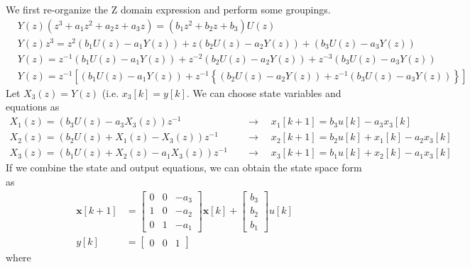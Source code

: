 \documentclass[twoside]{article}
\begin{document}
We first re-organize the Z domain expression and perform some
groupings. 
%
\begin{align*}
&Y(z) \left( z^3+ a_1 z^2 + a_2 z + a_3 z \right) = \left( b_1 z^2 + b_2 z + b_3 \right) U(z)
\\
&Y(z) z^3 = z^2 \left( b_1 U(z) - a_1 Y(z) \right) 
+  z \left( b_2 U(z) - a_2 Y(z) \right) +  \left( b_3 U(z) - a_3 Y(z)
  \right) 
\\
&Y(z) = z^{-1} \left( b_1 U(z) - a_1 Y(z) \right) 
+  z^{-2} \left( b_2 U(z) - a_2 Y(z) \right) + z^{-3} \left( b_3 U(z)
  - a_3 Y(z) \right) 
\\
&Y(z) = z^{-1} \left[ \left( b_1 U(z) - a_1 Y(z) \right) 
+  z^{-1} \left\lbrace \left( b_2 U(z) - a_2 Y(z) \right) + z^{-1} \left( b_3 U(z)
  - a_3 Y(z) \right) \right\rbrace \right]
\end{align*}
%
Let $X_3(z) = Y(z)$ (i.e. $x_3[k] = y[k]$. We can choose state
variables and equations as
%
\begin{align*}
X_1(z) = \left( b_3 U(z) - a_3 X_3(z) \right) z^{-1}
\quad &\rightarrow \quad x_1[k+1] = b_3 u[k] - a_3  x_3[k] 
\\
X_2(z) = \left( b_2 U(z) + X_1(z) - X_3(z) \right) z^{-1}
\quad &\rightarrow \quad x_2[k+1] = b_2 u[k] + x_1[k] - a_2 
        x_3[k] 
\\
X_3(z) = \left( b_1 U(z) + X_2(z) - a_1 X_3(z) \right) z^{-1}
\quad &\rightarrow \quad x_3[k+1] = b_1 u[k] + x_2[k] - a_1 
        x_3[k] 
\end{align*}
%
If we combine the state and output equations, we
can obtain the state space form as
%
%
\begin{align*}
  \mathbf{x}[k+1] &= \left[ \begin{array}{ccc} 0 & 0 & -a_3 \\ 1 & 0 & -a_2
    \\ 0 & 1 & -a_1 \end{array} \right] \mathbf{x}[k]
   + 
  \left[ \begin{array}{c} b_3 \\ b_2 
    \\ b_1 \end{array} \right] u[k]
\\
y[k] &= \left[ \begin{array}{ccc} 0 & 0 & 1 \end{array} \right]
\end{align*}
%
where 
%
\end{document}
